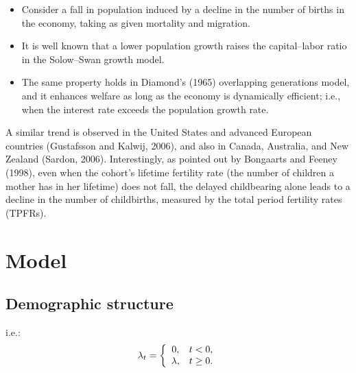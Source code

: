 \documentclass[nogrid]{MBE}%
\begin{document}
\begin{itemize}
\item Consider a fall in population induced by a decline in the number of births in the economy,
taking as given mortality and migration.

\item It is well known that a lower population growth raises the capital--labor ratio in the Solow--Swan
growth model.

\item The same property holds in Diamond's (1965) overlapping generations model, and it enhances welfare
as long as the economy is dynamically efficient; i.e., when the interest rate exceeds the
population growth rate.
\end{itemize}
 A similar trend is observed in the United
States and advanced European countries (Gustafsson and Kalwij, 2006), and also in Canada,
Australia, and New Zealand (Sardon, 2006). Interestingly, as pointed out by Bongaarts and Feeney
(1998), even when the cohort's lifetime fertility rate (the number of children a mother has in her
lifetime) does not fall, the delayed childbearing alone leads to a decline in the number of
childbirths, measured by the total period fertility rates (TPFRs). %


\section{Model\label{sec:Model}}

\subsection{Demographic structure}



i.e.:
\begin{equation}
\lambda_{t}=\left\{
\begin{array}
[c]{cc}%
0, & t<0,\\
\lambda, & t\geq0.
\end{array}
\right.  \label{eq:lambda}%
\end{equation}
\end{document}

